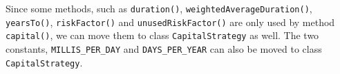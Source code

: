 \documentclass[a4paper,11pt]{memoir}
\newcommand{\code}[1]{\lstinline{#1}}
\begin{document}
\begin{exercise}
	Since some methods, such as \code{duration()}, \code{weightedAverageDuration()}, \code{yearsTo()},  \code{riskFactor()} and \code{unusedRiskFactor()} are only used by method \code{capital()}, we can move them to class \code{CapitalStrategy} as well.
	The two constants, \code{MILLIS_PER_DAY} and \code{DAYS_PER_YEAR} can also be moved to class  \code{CapitalStrategy}.
\end{exercise}



\end{document}
